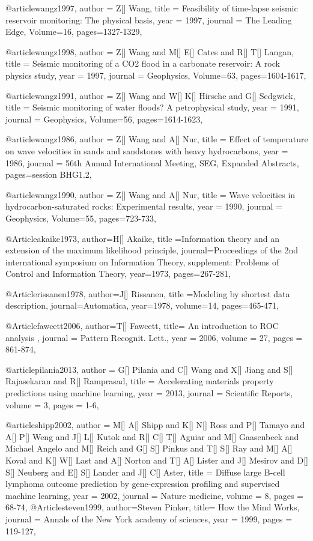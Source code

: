 @article{wangz1997,
  author =	 {Z[] Wang},
  title =	 {Feasibility of time-lapse seismic reservoir monitoring:
The physical basis},
  year =	 1997,
  journal =	 {The Leading Edge},
    Volume=16,
 pages=1327-1329,
}

@article{wangz1998,
  author =	 {Z[] Wang and M[] E[] Cates and R[] T[] Langan},
  title =	 {Seismic monitoring of a CO2 flood in a carbonate reservoir: A rock physics study},
  year =	 1997,
  journal =	 {Geophysics},
    Volume=63,
 pages=1604-1617,
}

@article{wangz1991,
  author =	 {Z[] Wang and W[] K[] Hirsche and G[] Sedgwick},
  title =	 {Seismic monitoring of water floods? A petrophysical study},
  year =	 1991,
  journal =	 {Geophysics},
    Volume=56,
 pages=1614-1623,
}

@article{wangz1986,
  author =	 {Z[] Wang and A[] Nur},
  title =	 {Effect of temperature on wave velocities in
sands and sandstones with heavy hydrocarbons},
  year =	 1986,
 journal =	 {56th Annual International Meeting, SEG, Expanded Abstracts},
 pages=session BHG1.2,
}

@article{wangz1990,
  author =	 {Z[] Wang and A[] Nur},
  title =	 {Wave velocities in hydrocarbon-saturated rocks: Experimental results},
  year =	 1990,
  journal =	 {Geophysics},
    Volume=55,
 pages=723-733,
}


@Article{akaike1973,
  author={H[] Akaike},
  title ={Information theory and an extension of the maximum likelihood principle},
  journal={Proceedings of the 2nd international symposium on Information Theory, supplement: Problems of Control and Information Theory},
  year=1973,
  pages={267-281},
}

@Article{rissanen1978,
  author={J[] Rissanen},
  title ={Modeling by shortest data description},
  journal={Automatica},
  year=1978,
  volume=14,
  pages={465-471},
}

@Article{fawcett2006,
  author={T[] Fawcett},
  title={ An introduction to ROC analysis },
  journal = 	 {Pattern Recognit. Lett.},
  year = 	 2006,
  volume =	 27,
  pages =	 {861-874},
}

@article{pilania2013,
author = {G[] Pilania and C[] Wang and X[] Jiang and S[] Rajasekaran and R[] Ramprasad},
title = {Accelerating materials property predictions using machine learning},
year = {2013},
journal = {Scientific Reports},
volume = {3},
pages = {1-6},
}

@article{shipp2002,
author = {M[] A[] Shipp and K[] N[] Ross and P[] Tamayo and A[] P[] Weng and J[] L[] Kutok and R[] C[] T[] Aguiar and M[] Gaasenbeek and Michael Angelo and M[] Reich and G[] S[] Pinkus and T[] S[] Ray and M[] A[] Koval and K[] W[] Last and A[] Norton and T[] A[] Lister and J[] Mesirov and D[] S[] Neuberg and E[] S[] Lander and J[] C[] Aster},
title = {Diffuse large B-cell lymphoma outcome prediction by gene-expression profiling and supervised machine learning},
year = {2002},
journal = {Nature medicine},
volume = {8},
pages = {68-74},
}
@Article{steven1999,
  author={Steven Pinker},
  title={ How the Mind Works},
  journal = 	 {Annals of the New York academy of sciences},
  year = 	 1999,
  pages =	 {119-127},
}

